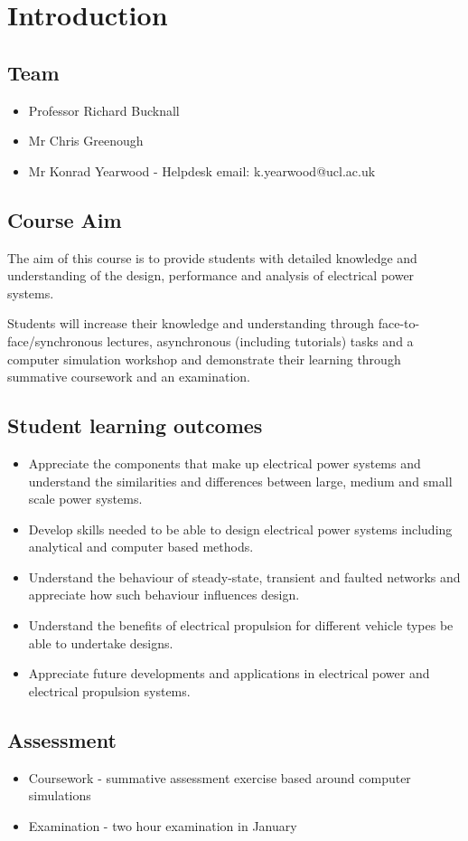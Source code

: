 \documentclass[class=report, crop=false, 12pt,a4paper]{standalone}
\begin{document}
\chapter{Introduction}
\section{Team}
\begin{itemize}
	\item Professor Richard Bucknall
	\item Mr Chris Greenough
	\item Mr Konrad Yearwood - Helpdesk email: k.yearwood@ucl.ac.uk
\end{itemize}
\section{Course Aim}
The aim of this course is to provide students with detailed knowledge and understanding of the design, performance and analysis of electrical power systems.

Students will increase their knowledge and understanding through face-to-face/synchronous lectures, asynchronous (including tutorials) tasks and a computer simulation workshop and demonstrate their learning through summative coursework and an examination.
\section{Student learning outcomes}
\begin{itemize}
	\item Appreciate the components that make up electrical power systems and understand the similarities and differences between large, medium and small scale power systems.
	\item Develop skills needed to be able to design electrical power systems including analytical and computer based methods.
	\item Understand the behaviour of steady-state, transient and faulted networks and appreciate how such behaviour influences design.
	\item Understand the benefits of electrical propulsion for different vehicle types be able to undertake designs.
	\item Appreciate future developments and applications in electrical power and electrical propulsion systems.
\end{itemize}
\section{Assessment}
\begin{itemize}
	\item Coursework - summative assessment exercise based around computer simulations
	\item Examination - two hour examination in January
\end{itemize}
\end{document}
